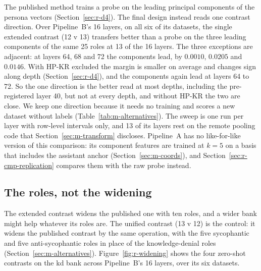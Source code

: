The published method trains a probe on the leading principal components of the persona vectors (Section~\ref{sec:r-d4}).
The final design instead reads one contrast direction.
Over Pipeline~B's 16 layers, on all six of its datasets, the single extended contrast (12 v 13) transfers better than a probe on the three leading components of the same 25 roles at 13 of the 16 layers. %
The three exceptions are adjacent: at layers 64, 68 and 72 the components lead, by $0.0010$, $0.0205$ and $0.0146$. %
With HP-KR excluded the margin is smaller on average and changes sign along depth (Section~\ref{sec:r-d4}), and the components again lead at layers 64 to 72. %
So the one direction is the better read at most depths, including the pre-registered layer 40, but not at every depth, and without HP-KR the two are close. %
We keep one direction because it needs no training and scores a new dataset without labels (Table~\ref{tab:m-alternatives}). %
The sweep is one run per layer with row-level intervals only, and 13 of its layers rest on the remote pooling code that Section~\ref{sec:m-transform} discloses. %
Pipeline~A has no like-for-like version of this comparison: its component features are trained at $k=5$ on a basis that includes the assistant anchor (Section~\ref{sec:m-coords}), and Section~\ref{sec:r-cmp-replication} compares them with the raw probe instead. %

\subsection{The roles, not the widening}
\label{sec:r-adj-roles}

The extended contrast widens the published one with ten roles, and a wider bank might help whatever its roles are.
The unified contrast (13 v 12) is the control: it widens the published contrast by the same operation, with the five sycophantic and five anti-sycophantic roles in place of the knowledge-denial roles (Section~\ref{sec:m-alternatives}). %
Figure~\ref{fig:r-widening} shows the four zero-shot contrasts on the kd bank across Pipeline~B's 16 layers, over its six datasets.

